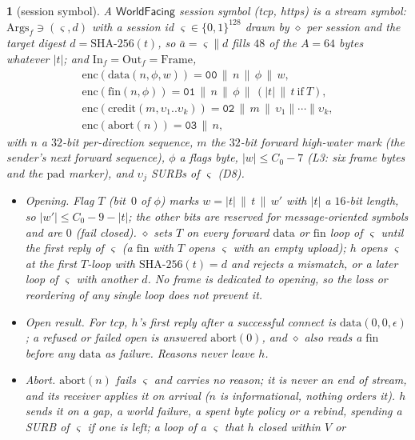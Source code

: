 \documentclass[journal]{IEEEtran}
\newcommand{\namedhead}{}
\newtheorem*{namedenv}{\namedhead}
\newenvironment{defD}[2]{\renewcommand{\namedhead}{Definition #1}%
  \begin{namedenv}[#2]}{\end{namedenv}}
\newcommand{\WF}{\mathsf{WorldFacing}}
\newcommand{\cl}{\diamond}
\newcommand{\pad}{\mathrm{pad}}
\newcommand{\enc}{\mathrm{enc}}
\newcommand{\Args}{\mathrm{Args}}
\newcommand{\In}{\mathrm{In}}
\newcommand{\Out}{\mathrm{Out}}
\newcommand{\sid}{\varsigma}
\DeclareRobustCommand{\code}[1]{{\ttfamily\renewcommand{\_}{\textunderscore\allowbreak}#1}}
\begin{document}
\begin{defD}{D2$'$}{session symbol}
A $\WF$ session symbol (\code{tcp}, \code{https}) is a stream symbol:
$\Args_f\ni(\sid,d)$ with a session id
$\sid\in\{0,1\}^{128}$ drawn by $\cl$ per session and the target digest
$d=\mathrm{SHA\text{-}256}(t)$, so $\bar a=\sid\|d$ fills $48$ of the
$A=64$ bytes whatever $|t|$; and $\In_f=\Out_f=\mathrm{Frame}$,
\begin{gather*}
\enc(\mathrm{data}(n,\phi,w))=\mathtt{00}\,\|\,n\,\|\,\phi\,\|\,w,\\
\enc(\mathrm{fin}(n,\phi))=\mathtt{01}\,\|\,n\,\|\,\phi\,\|\,(|t|\,\|\,t\ \text{if}\ T),\\
\enc(\mathrm{credit}(m,\upsilon_1..\upsilon_k))=\mathtt{02}\,\|\,m\,\|\,\upsilon_1\|\cdots\|\upsilon_k,\\
\enc(\mathrm{abort}(n))=\mathtt{03}\,\|\,n,
\end{gather*}
with $n$ a $32$-bit per-direction sequence, $m$ the $32$-bit forward
high-water mark (the sender's next forward sequence), $\phi$ a flags byte,
$|w|\le C_0-7$ (L3: six frame bytes and the $\pad$ marker), and
$\upsilon_j$ SURBs of $\sid$ (D8).
\begin{itemize}
\item \emph{Opening.}  Flag $T$ (bit~$0$ of $\phi$) marks
  $w=|t|\,\|\,t\,\|\,w'$ with $|t|$ a $16$-bit length, so
  $|w'|\le C_0-9-|t|$; the other bits are
  reserved for message-oriented symbols and are $0$ (fail closed).  $\cl$
  sets $T$ on every forward $\mathrm{data}$ or $\mathrm{fin}$ loop of
  $\sid$ until the first reply of $\sid$ (a $\mathrm{fin}$ with $T$ opens
  $\sid$ with an empty upload); $h$ opens $\sid$ at the first $T$-loop with
  $\mathrm{SHA\text{-}256}(t)=d$ and rejects a mismatch, or a later loop of
  $\sid$ with another $d$.  No frame is dedicated to opening, so the loss
  or reordering of any single loop does not prevent it.
\item \emph{Open result.}  For \code{tcp}, $h$'s first reply after a
  successful connect is $\mathrm{data}(0,0,\epsilon)$; a refused or
  failed open is answered $\mathrm{abort}(0)$, and $\cl$ also reads a
  $\mathrm{fin}$ before any $\mathrm{data}$ as failure.  Reasons never
  leave $h$.
\item \emph{Abort.}  $\mathrm{abort}(n)$ fails $\sid$ and carries no
  reason; it is never an end of stream, and its receiver applies it on
  arrival ($n$ is informational, nothing orders it).  $h$ sends it on a
  gap, a world failure, a spent byte policy or a rebind, spending a SURB of
  $\sid$ if one is left; a loop of a $\sid$ that $h$ closed within $V$ or

\end{itemize}
\end{defD}
\end{document}
